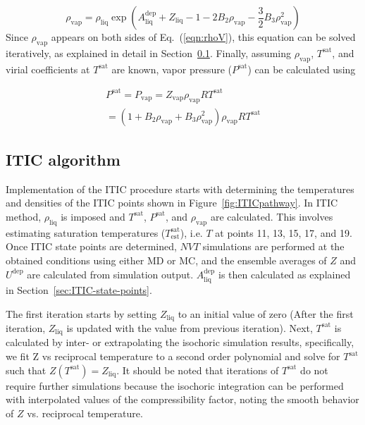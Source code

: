 \documentclass[5p,times]{elsarticle}
\begin{document}
\begin{equation}
\rho _{\mathrm{vap}} = \rho _\mathrm{liq} \exp \left( A^\mathrm{dep}_\mathrm{liq} + {Z_{\mathrm{liq}}} - 1 - 2{B_2} {\rho _{\mathrm{vap}}} - \frac{3}{2}{B_3} \rho _{\mathrm{vap}}^2
\right)
\label{eqn:rhoV}
\end{equation}
Since $\rho_\mathrm{vap}$ appears on both sides of Eq.~(\ref{eqn:rhoV}), this equation can be solved iteratively, as explained in detail in Section~\ref{sec:ITIC-algorithm}. Finally, assuming $\rho_\mathrm{vap}$, $T^\mathrm{sat}$, and virial coefficients at $T^\mathrm{sat}$ are known, vapor pressure ($P^\mathrm{sat}$) can be calculated using

\begin{equation}
\begin{array}{l}
P^\mathrm{sat} = P_\mathrm{vap} = {Z_\mathrm{vap}}{\rho _\mathrm{vap}}RT^\mathrm{sat}
\\
= (1 + {B_2} {\rho_\mathrm{vap}} + {B_3}\rho _\mathrm{vap}^2){\rho _\mathrm{vap}}RT^\mathrm{sat} 
\end{array}
\label{eqn:psat}
\end{equation}



\subsection{ITIC algorithm}\label{sec:ITIC-algorithm}
Implementation of the ITIC procedure starts with determining the temperatures and densities of the ITIC points shown in Figure~\ref{fig:ITICpathway}. In ITIC method, $\rho_\mathrm{liq}$ is imposed and $T^\mathrm{sat}$, $P^\mathrm{sat}$, and $\rho_\mathrm{vap}$ are calculated. This involves estimating saturation temperatures ($T^\mathrm{sat}_\mathrm{est}$), i.e. $T$ at points 11, 13, 15, 17, and 19. Once ITIC state points are determined, $NVT$ simulations are performed at the obtained conditions using either MD or MC, and the ensemble averages of $Z$ and $U^\mathrm{dep}$ are calculated from simulation output. $A^\mathrm{dep}_\mathrm{liq}$ is then calculated as explained in Section~\ref{sec:ITIC-state-points}. 

The first iteration starts by setting $Z_\mathrm{liq}$ to an initial value of zero (After the first iteration, $Z_\mathrm{liq}$ is updated with the value from previous iteration). Next, $T^\mathrm{sat}$ is calculated by inter- or extrapolating the isochoric simulation results, specifically, we fit Z vs reciprocal temperature to a second order polynomial and solve for $T^\mathrm{sat}$ such that $Z(T^\mathrm{sat})=Z_\mathrm{liq}$. It should be noted that iterations of $T^\mathrm{sat}$ do not require further simulations because the isochoric integration can be performed with interpolated values of the compressibility factor, noting the smooth behavior of $Z$ vs. reciprocal temperature.
\end{document}

